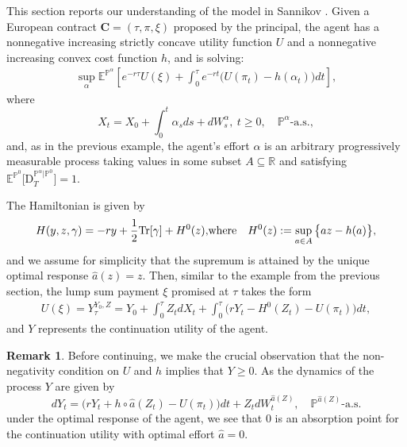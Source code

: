 \documentclass[11pt,a4paper]{article}
\numberwithin{equation}{section}
\def\dbE{\mathbb{E}}
\def\dbP{\mathbb{P}}
\def\dbR{\mathbb{R}}
\newcommand{\Cbf}{\mathbf{C}}
\newcommand{\beaa}{\begin{eqnarray*}}
\newcommand{\eeaa}{\end{eqnarray*}}
\theoremstyle{definition}
\newtheorem{remark}[theorem]{Remark}
\begin{document}
This section reports our understanding of the model in Sannikov \cite{Sannikov08}. 
Given a European contract $\Cbf=(\tau,\pi,\xi)$ proposed by the principal, the agent has a nonnegative increasing strictly concave utility function $U$ and a nonnegative increasing convex cost function $h$, and is solving:
 \beaa
 \sup_{\alpha} \dbE^{\dbP^{\alpha}}\left[e^{-r\tau}U(\xi)+\int_0^\tau e^{-rt}\big(U(\pi_t)-h(\alpha_t)\big) dt\right], 
 \eeaa
 where
  $$ X_t=X_0+\int_0^t \alpha_sds+dW^\alpha_s, ~t\geq 0,\quad \dbP^\alpha\mbox{-a.s.}, $$
and, as in the previous example, the agent's effort $\alpha$ is an arbitrary progressively measurable process taking values in some subset $A\subseteq\dbR$ and satisfying $\dbE^{\dbP^0}\big[\mathrm{D}^{\dbP^\alpha |\dbP^0}_T\big]=1$. 

The Hamiltonian is given by
 \beaa
 H(y,z,\gamma)
 =
 -ry+
 \frac12{\rm Tr}[\gamma]+H^0(z),
 &\mbox{where}&
 H^0(z)
 :=
 \sup_{a\in A} \big\{az-h(a)\big\},
 \eeaa
and we assume for simplicity that the supremum is attained by the unique optimal response $\widehat a(z)=z$. Then, similar to the example from the previous section, the lump sum payment $\xi$ promised at $\tau$ takes the form
 \beaa
 U(\xi)
 = 
 Y^{Y_0,Z}_\tau
 =
 Y_0+\int_0^\tau Z_t dX_t + \int_0^\tau\big(rY_t-H^0(Z_t)-U(\pi_t)\big)dt,
 \eeaa
and $Y$ represents the continuation utility of the agent. 

\begin{remark} \label{rem:y=0}
Before continuing, we make the crucial observation that the non-negativity condition on $U$ and $h$ implies that $Y\ge 0$. As the dynamics of the process $Y$ are given by 
 $$ dY_t=\big(rY_t+h\circ\widehat a(Z_t)-U(\pi_t)\big)dt+Z_t dW_t^{\widehat a(Z)}, \quad \dbP^{\widehat a(Z)}\mbox{-a.s.}$$ 
 under the optimal response of the agent, we see that $0$ is an absorption point for the continuation utility with optimal effort $\widehat a=0$. 
\end{remark}
\end{document}
